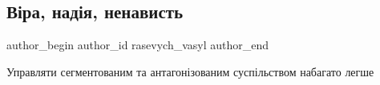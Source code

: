  
 
 
 
 
\subsection{Віра, надія, ненависть}
\ifcmt
  author_begin
   author_id rasevych_vasyl
  author_end
\fi

Управляти сегментованим та антагонізованим суспільством набагато легше
